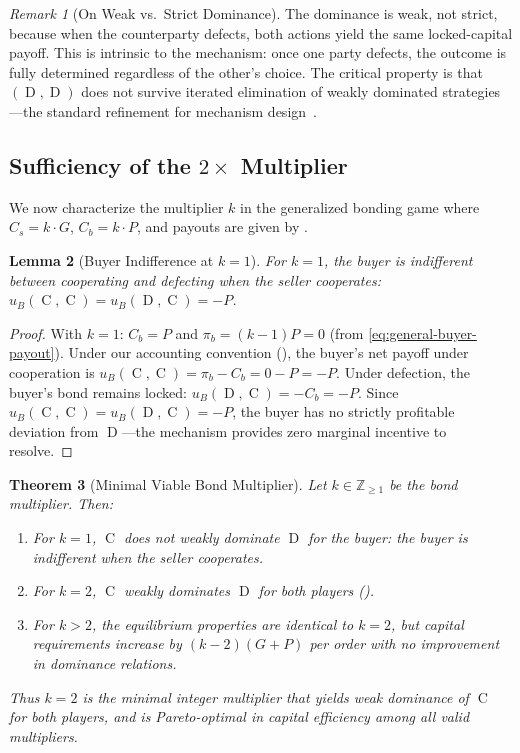 \documentclass[11pt,a4paper]{article}
\newtheorem{theorem}{Theorem}[section]
\newtheorem{lemma}[theorem]{Lemma}
\theoremstyle{definition}
\theoremstyle{remark}
\newtheorem{remark}[theorem]{Remark}
\newcommand{\pay}{P}           %
\newcommand{\cumval}{G}        %
\newcommand{\sbond}{C_s}       %
\newcommand{\bbond}{C_b}       %
\newcommand{\bpay}{\pi_b}      %
\newcommand{\ub}{u_B}          %
\DeclareMathOperator{\Coop}{C}
\DeclareMathOperator{\Def}{D}
\begin{document}
\begin{remark}[On Weak vs.\ Strict Dominance]
\label{rem:dominance-note}
The dominance is weak, not strict, because when the counterparty
defects, both actions yield the same locked-capital payoff. This is
intrinsic to the mechanism: once one party defects, the outcome is
fully determined regardless of the other's choice. The critical
property is that $(\Def, \Def)$ does not survive iterated elimination
of weakly dominated strategies---the standard refinement for
mechanism design~\citep{myerson1981}.
\end{remark}

\subsection{Sufficiency of the $2\times$ Multiplier}

We now characterize the multiplier $k$ in the generalized bonding game
where $\sbond = k \cdot \cumval$, $\bbond = k \cdot \pay$, and
payouts are given by .

\begin{lemma}[Buyer Indifference at $k = 1$]
\label{lem:k1-buyer}
For $k = 1$, the buyer is indifferent between cooperating and defecting
when the seller cooperates:
$\ub(\Coop, \Coop) = \ub(\Def, \Coop) = -\pay$.
\end{lemma}
\begin{proof}
With $k = 1$: $\bbond = \pay$ and $\bpay = (k-1)\pay = 0$ (from
\eqref{eq:general-buyer-payout}). Under our accounting convention
(), the buyer's net payoff under cooperation
is $\ub(\Coop, \Coop) = \bpay - \bbond = 0 - \pay = -\pay$. Under
defection, the buyer's bond remains locked:
$\ub(\Def, \Coop) = -\bbond = -\pay$. Since
$\ub(\Coop, \Coop) = \ub(\Def, \Coop) = -\pay$, the buyer has no
strictly profitable deviation from $\Def$---the mechanism provides
zero marginal incentive to resolve.
\end{proof}

\begin{theorem}[Minimal Viable Bond Multiplier]
\label{thm:2x-sufficient}
Let $k \in \mathbb{Z}_{\geq 1}$ be the bond multiplier. Then:
\begin{enumerate}[label=(\alph*)]
  \item For $k = 1$, $\Coop$ does not weakly dominate $\Def$ for the
    buyer: the buyer is indifferent when the seller cooperates.
  \item For $k = 2$, $\Coop$ weakly dominates $\Def$ for both players
    ().
  \item For $k > 2$, the equilibrium properties are identical to $k = 2$,
    but capital requirements increase by $(k - 2)(\cumval + \pay)$ per
    order with no improvement in dominance relations.
\end{enumerate}
Thus $k = 2$ is the minimal integer multiplier that yields weak
dominance of $\Coop$ for both players, and is Pareto-optimal in
capital efficiency among all valid multipliers.
\end{theorem}
\end{document}
